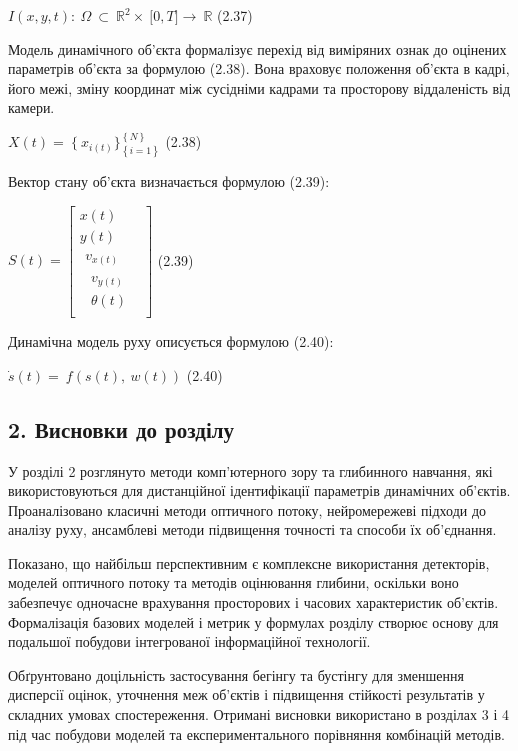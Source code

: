 \documentclass[
]{article}
\begin{document}
\(I(x,y,t):\ \Omega\  \subset \ \mathbb{R}^{2} \times \ \lbrack 0,T\rbrack\mathbb{\rightarrow \ R}\) (2.37)

Модель динамічного об'єкта формалізує перехід від виміряних ознак до оцінених параметрів об'єкта за формулою (2.38). Вона враховує положення об'єкта в кадрі, його межі, зміну координат між сусідніми кадрами та просторову віддаленість від камери.

\(X(t) = \ \text{\{}\ x_{i(t)}\text{\}}_{\left\{ i = 1 \right\}}^{\left\{ N \right\}}\) (2.38)

Вектор стану об'єкта визначається формулою (2.39):

\(S(t) = \begin{bmatrix}
x(t) \\
y(t) \\
\begin{matrix}
v_{x(t)} \\
\begin{matrix}
v_{y(t)} \\
\theta(t)
\end{matrix}
\end{matrix}
\end{bmatrix}\) (2.39)

Динамічна модель руху описується формулою (2.40):

\(\dot{s}(t) = \ f\left( s(t),\ w(t) \right)\) (2.40)

\subsection{2. Висновки до розділу}\label{ux432ux438ux441ux43dux43eux432ux43aux438-ux434ux43e-ux440ux43eux437ux434ux456ux43bux443-1}

У розділі 2 розглянуто методи комп'ютерного зору та глибинного навчання, які використовуються для дистанційної ідентифікації параметрів динамічних об'єктів. Проаналізовано класичні методи оптичного потоку, нейромережеві підходи до аналізу руху, ансамблеві методи підвищення точності та способи їх об'єднання.

Показано, що найбільш перспективним є комплексне використання детекторів, моделей оптичного потоку та методів оцінювання глибини, оскільки воно забезпечує одночасне врахування просторових і часових характеристик об'єктів. Формалізація базових моделей і метрик у формулах розділу створює основу для подальшої побудови інтегрованої інформаційної технології.

Обґрунтовано доцільність застосування бегінгу та бустінгу для зменшення дисперсії оцінок, уточнення меж об'єктів і підвищення стійкості результатів у складних умовах спостереження. Отримані висновки використано в розділах 3 і 4 під час побудови моделей та експериментального порівняння комбінацій методів.
\end{document}
